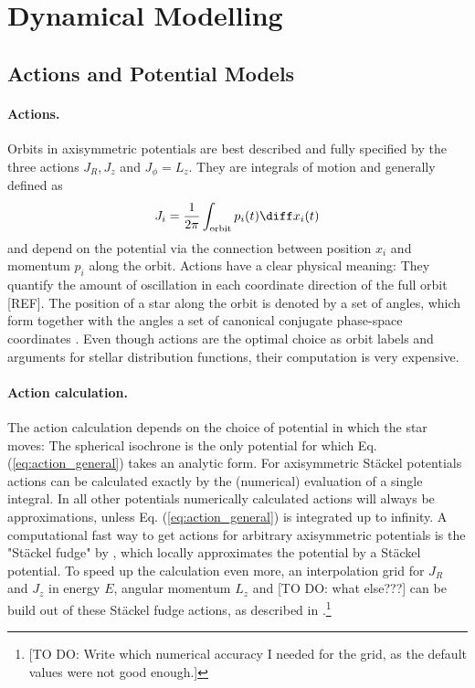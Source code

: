\section{Dynamical Modelling}

\subsection{Actions and Potential Models}  \label{sec:potentials}

\paragraph{Actions.} Orbits in axisymmetric potentials are best described and fully specified by the three actions $J_R, J_z$ and $J_\phi=L_z$. They are integrals of motion and generally defined as
\begin{equation}
J_i = \frac{1}{2\pi} \int_\text{orbit} p_i(t) \diff x_i(t) \label{eq:action_general}
\end{equation}
and depend on the potential via the connection between position $x_i$ and momentum $p_i$ along the orbit. Actions have a clear physical meaning: They quantify the amount of oscillation in each coordinate direction of the full orbit [REF]. The position of a star along the orbit is denoted by a set of angles, which form together with the angles a set of canonical conjugate phase-space coordinates \citep{bin08}. Even though actions are the optimal choice as orbit labels and arguments for stellar distribution functions, their computation is very expensive.

\paragraph{Action calculation.} The action calculation depends on the choice of potential in which the star moves: The spherical isochrone \citep{bin08} is the only potential for which Eq. (\ref{eq:action_general}) takes an analytic form. For axisymmetric St\"{a}ckel potentials actions can be calculated exactly by the (numerical) evaluation of a single integral. In all other potentials numerically calculated actions will always be approximations, unless Eq. (\ref{eq:action_general}) is integrated up to infinity.  A computational fast way to get actions for arbitrary axisymmetric potentials is the "St\"{a}ckel fudge" by \citet{bin12}, which locally approximates the potential by a St\"{a}ckel potential. To speed up the calculation even more, an interpolation grid for $J_R$ and $J_z$ in energy $E$, angular momentum $L_z$ and [TO DO: what else???] can be build out of these St\"{a}ckel fudge actions, as described in \citet{bov15}.\footnote{[TO DO: Write which numerical accuracy I needed for the grid, as the default values were not good enough.]} 

